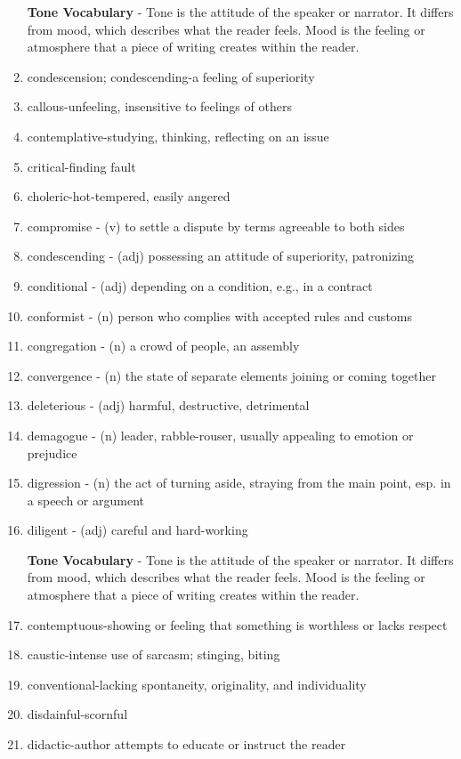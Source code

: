 \documentclass[12pt]{book}
\begin{document}
\begin{enumerate}
\bigskip
\textbf{Tone Vocabulary} - Tone is the attitude of the speaker or narrator.  It differs from mood, which describes what the reader feels.  Mood is the feeling or atmosphere that a piece of writing creates within the reader.  

\item condescension; condescending-a feeling of superiority
\item callous-unfeeling, insensitive to feelings of others
\item contemplative-studying, thinking, reflecting on an issue
\item critical-finding fault
\item choleric-hot-tempered, easily angered 

\bigskip
\item compromise - (v) to settle a dispute by terms agreeable to both sides
\item condescending - (adj) possessing an attitude of superiority, patronizing
\item conditional - (adj) depending on a condition, e.g., in a contract
\item conformist - (n) person who complies with accepted rules and customs
\item congregation - (n) a crowd of people, an assembly
\item convergence - (n) the state of separate elements joining or coming together
\item deleterious - (adj) harmful, destructive, detrimental
\item demagogue - (n) leader, rabble-rouser, usually appealing to emotion or prejudice
\item digression - (n) the act of turning aside, straying from the main point, esp. in a speech or argument
\item diligent - (adj) careful and hard-working

\bigskip
\textbf{Tone Vocabulary} - Tone is the attitude of the speaker or narrator.  It differs from mood, which describes what the reader feels.  Mood is the feeling or atmosphere that a piece of writing creates within the reader.  


\item contemptuous-showing or feeling that something is worthless or lacks respect
\item caustic-intense use of sarcasm; stinging, biting
\item conventional-lacking spontaneity, originality, and individuality
\item disdainful-scornful
\item didactic-author attempts to educate or instruct the reader 


\end{enumerate}
\end{document}
